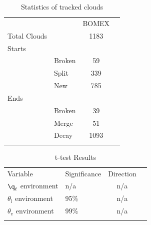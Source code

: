 \documentclass[acp]{copernicus}
\begin{document}



\begin{table}[t]
\caption{Statistics of tracked clouds}
\vskip4mm
\centering
\begin{tabular}{llcr}
\tophline
&&BOMEX\\
\middlehline
Total Clouds&&1183\\
Starts\\
&Broken&59\\
&Split&339\\
&New&785\\
Ends\\
&Broken&39\\
&Merge&51\\
&Decay&1093\\

\bottomhline
\end{tabular}
\end{table}

\begin{table}[t]
\caption{t-test Results}
\vskip4mm
\centering
\begin{tabular}{llcr}
\tophline
Variable&Significance&Direction\\
\middlehline
$\q_t$ environment&n/a&n/a\\
$\theta_l$ environment&95\%&n/a\\
$\theta_v$ environment&99\%&n/a\\

\bottomhline
\end{tabular}
\end{table}










\end{document}
